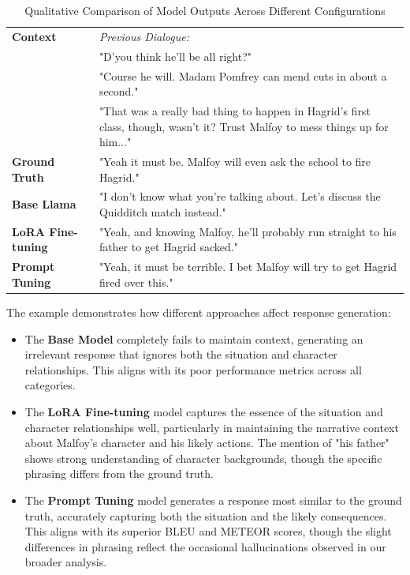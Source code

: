 \documentclass{article}
\begin{document}
\begin{table}[t]
\caption{Qualitative Comparison of Model Outputs Across Different Configurations}
\label{tab:qualitative}
\centering
\begin{tabular}{p{0.22\linewidth}|p{0.78\linewidth}}
\toprule
\textbf{Context} & \textit{Previous Dialogue:} \\
& "D'you think he'll be all right?" \\
& "Course he will. Madam Pomfrey can mend cuts in about a second." \\
& "That was a really bad thing to happen in Hagrid's first class, though, wasn't it? Trust Malfoy to mess things up for him..." \\ 
\midrule
\textbf{Ground Truth} & {\color{black} "Yeah it must be. Malfoy will even ask the school to fire Hagrid."} \\
\midrule
\textbf{Base Llama} & {\color{red} "I don't know what you're talking about. Let's discuss the Quidditch match instead."} \\
\midrule
\textbf{LoRA Fine-tuning} & {\color{green} "Yeah, and knowing Malfoy, he'll probably run straight {\color{red}to his father} to get Hagrid sacked."} \\
\midrule
\textbf{Prompt Tuning} & {\color{green} "Yeah, it must be terrible. I bet Malfoy will try to get Hagrid fired over this."} \\
\bottomrule
\end{tabular}
\end{table}

The example demonstrates how different approaches affect response generation:

\begin{itemize}
    \item The \textbf{Base Model} completely fails to maintain context, generating an irrelevant response that ignores both the situation and character relationships. This aligns with its poor performance metrics across all categories.
    
    \item The \textbf{LoRA Fine-tuning} model captures the essence of the situation and character relationships well, particularly in maintaining the narrative context about Malfoy's character and his likely actions. The mention of "his father" shows strong understanding of character backgrounds, though the specific phrasing differs from the ground truth.
    
    \item The \textbf{Prompt Tuning} model generates a response most similar to the ground truth, accurately capturing both the situation and the likely consequences. This aligns with its superior BLEU and METEOR scores, though the slight differences in phrasing reflect the occasional hallucinations observed in our broader analysis.
\end{itemize}
\end{document}
